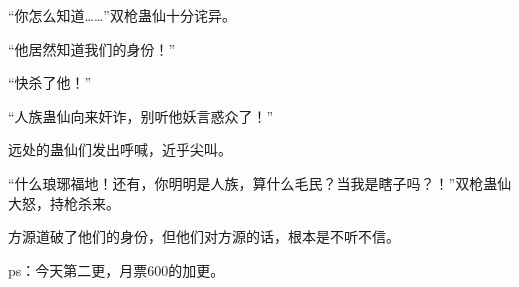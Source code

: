 \begin{this_body}
“你怎么知道……”双枪蛊仙十分诧异。

“他居然知道我们的身份！”

“快杀了他！”

“人族蛊仙向来奸诈，别听他妖言惑众了！”

远处的蛊仙们发出呼喊，近乎尖叫。

“什么琅琊福地！还有，你明明是人族，算什么毛民？当我是瞎子吗？！”双枪蛊仙大怒，持枪杀来。

方源道破了他们的身份，但他们对方源的话，根本是不听不信。

ps：今天第二更，月票600的加更。

\end{this_body}

